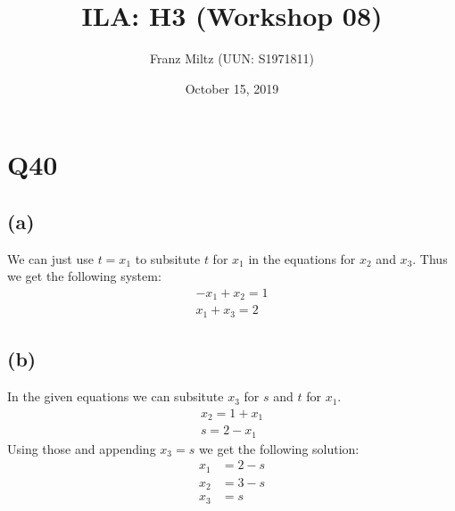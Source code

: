 \documentclass{article}
\title{ILA: H3 (Workshop 08)}
\author{Franz Miltz (UUN: S1971811)}
\date{October 15, 2019}
\begin{document}
\maketitle
\section*{Q40}
\subsection*{(a)}
We can just use $t=x_1$ to subsitute $t$ for $x_1$ in the equations for $x_2$ and $x_3$. Thus we get the following system:
\begin{align*}
    -x_1+x_2=1 \\
    x_1+x_3=2
\end{align*}
\subsection*{(b)}
In the given equations we can subsitute $x_3$ for $s$ and $t$ for $x_1$.
\begin{align*}
    x_2 = 1 + x_1 \\
    s = 2 - x_1
\end{align*}
Using those and appending $x_3=s$ we get the following solution:
\begin{align*}
    x_1 & = 2-s \\
    x_2 & = 3-s \\
    x_3 & = s
\end{align*}
\end{document}
